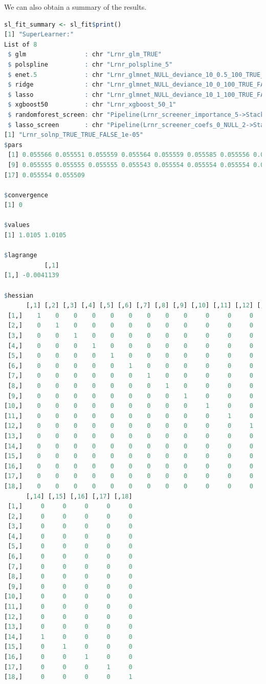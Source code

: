 \documentclass[12pt, krantz2,]{krantz}
\theoremstyle{definition}
\theoremstyle{definition}
\theoremstyle{definition}
\newcommand{\1}{\mathbbm{1}}
\begin{document}
We can also obtain a summary of the results.

\begin{lstlisting}[language=R]
sl_fit_summary <- sl_fit$print()
[1] "SuperLearner:"
List of 8
 $ glm                : chr "Lrnr_glm_TRUE"
 $ polspline          : chr "Lrnr_polspline_5"
 $ enet.5             : chr "Lrnr_glmnet_NULL_deviance_10_0.5_100_TRUE_FALSE"
 $ ridge              : chr "Lrnr_glmnet_NULL_deviance_10_0_100_TRUE_FALSE"
 $ lasso              : chr "Lrnr_glmnet_NULL_deviance_10_1_100_TRUE_FALSE"
 $ xgboost50          : chr "Lrnr_xgboost_50_1"
 $ randomforest_screen: chr "Pipeline(Lrnr_screener_importance_5->Stack)"
 $ lasso_screen       : chr "Pipeline(Lrnr_screener_coefs_0_NULL_2->Stack)"
[1] "Lrnr_solnp_TRUE_TRUE_FALSE_1e-05"
$pars
 [1] 0.055566 0.055551 0.055559 0.055564 0.055559 0.055585 0.055556 0.055574
 [9] 0.055555 0.055555 0.055555 0.055543 0.055554 0.055554 0.055554 0.055553
[17] 0.055554 0.055509

$convergence
[1] 0

$values
[1] 1.0105 1.0105

$lagrange
           [,1]
[1,] -0.0041139

$hessian
      [,1] [,2] [,3] [,4] [,5] [,6] [,7] [,8] [,9] [,10] [,11] [,12] [,13]
 [1,]    1    0    0    0    0    0    0    0    0     0     0     0     0
 [2,]    0    1    0    0    0    0    0    0    0     0     0     0     0
 [3,]    0    0    1    0    0    0    0    0    0     0     0     0     0
 [4,]    0    0    0    1    0    0    0    0    0     0     0     0     0
 [5,]    0    0    0    0    1    0    0    0    0     0     0     0     0
 [6,]    0    0    0    0    0    1    0    0    0     0     0     0     0
 [7,]    0    0    0    0    0    0    1    0    0     0     0     0     0
 [8,]    0    0    0    0    0    0    0    1    0     0     0     0     0
 [9,]    0    0    0    0    0    0    0    0    1     0     0     0     0
[10,]    0    0    0    0    0    0    0    0    0     1     0     0     0
[11,]    0    0    0    0    0    0    0    0    0     0     1     0     0
[12,]    0    0    0    0    0    0    0    0    0     0     0     1     0
[13,]    0    0    0    0    0    0    0    0    0     0     0     0     1
[14,]    0    0    0    0    0    0    0    0    0     0     0     0     0
[15,]    0    0    0    0    0    0    0    0    0     0     0     0     0
[16,]    0    0    0    0    0    0    0    0    0     0     0     0     0
[17,]    0    0    0    0    0    0    0    0    0     0     0     0     0
[18,]    0    0    0    0    0    0    0    0    0     0     0     0     0
      [,14] [,15] [,16] [,17] [,18]
 [1,]     0     0     0     0     0
 [2,]     0     0     0     0     0
 [3,]     0     0     0     0     0
 [4,]     0     0     0     0     0
 [5,]     0     0     0     0     0
 [6,]     0     0     0     0     0
 [7,]     0     0     0     0     0
 [8,]     0     0     0     0     0
 [9,]     0     0     0     0     0
[10,]     0     0     0     0     0
[11,]     0     0     0     0     0
[12,]     0     0     0     0     0
[13,]     0     0     0     0     0
[14,]     1     0     0     0     0
[15,]     0     1     0     0     0
[16,]     0     0     1     0     0
[17,]     0     0     0     1     0
[18,]     0     0     0     0     1


\end{lstlisting}
\end{document}
